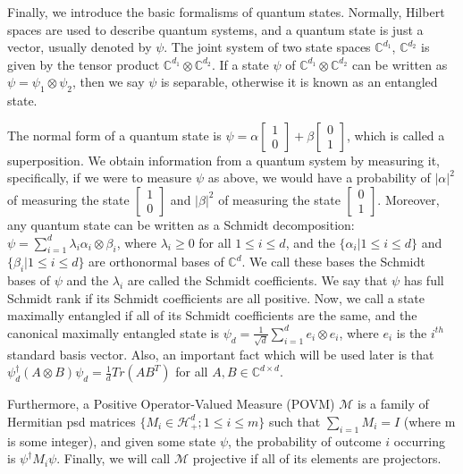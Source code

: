 \documentclass[12pt]{article}
\begin{document}
Finally, we introduce the basic formalisms of quantum
states. Normally, Hilbert spaces are used to describe quantum systems,
and a quantum state is just a vector, usually denoted by $\psi$. The
joint system of two state spaces $\mathbb{C}^{d_1}$,
$\mathbb{C}^{d_2}$ is given by the tensor product $\mathbb{C}^{d_1}
\otimes \mathbb{C}^{d_2}$. If a state $\psi$ of $\mathbb{C}^{d_1}
\otimes \mathbb{C}^{d_2}$ can be written as $\psi = \psi_1 \otimes
\psi_2$, then we say $\psi$ is separable, otherwise it is known as an
entangled state.

The normal form of a quantum state is $\psi = \alpha \begin{bmatrix}
1 \\
0 
\end{bmatrix}
+ \beta
\begin{bmatrix}
0 \\
1
\end{bmatrix}
$, which is called a superposition. We obtain information from a
quantum system by measuring it, specifically, if we were to measure
$\psi$ as above, we would have a probability of $|\alpha|^2$ of
measuring the state $\begin{bmatrix} 1 \\ 0
\end{bmatrix}$ and $|\beta|^2$ of measuring the state $\begin{bmatrix}
0 \\
1 
\end{bmatrix}$. Moreover, any quantum state can be written as a
Schmidt decomposition: $\psi = \sum_{i=1}^d \lambda_i \alpha_i \otimes
\beta_i$, where $\lambda_i \geq 0$ for all $1 \leq i \leq d$, and the
$\{\alpha_i| 1 \leq i \leq d\}$ and $\{\beta_i| 1 \leq i \leq d\}$ are
orthonormal bases of $\mathbb{C}^d$. We call these bases the Schmidt
bases of $\psi$ and the $\lambda_i$ are called the Schmidt
coefficients. We say that $\psi$ has full Schmidt rank if its Schmidt
coefficients are all positive. Now, we call a state maximally
entangled if all of its Schmidt coefficients are the same, and the
canonical maximally entangled state is $\psi_d = \frac{1}{\sqrt{d}}
\sum_{i=1}^d e_i \otimes e_i$, where $e_i$ is the $i^{th}$ standard
basis vector. Also, an important fact which will be used later is that
$\psi^{\dag}_d (A \otimes B) \psi_d = \frac{1}{d} Tr(AB^T)$ for all
$A, B \in \mathbb{C}^{d \times d}$.

Furthermore, a Positive Operator-Valued Measure (POVM) $\mathcal{M}$
is a family of Hermitian psd matrices $\{ M_i \in \mathcal{H}^d_+; 1
\leq i \leq m \}$ such that $\sum_{i=1}M_i = I$ (where m is some
integer), and given some state $\psi$, the probability of outcome $i$
occurring is $\psi^\dag M_i \psi$. Finally, we will call $\mathcal{M}$
projective if all of its elements are projectors.
\end{document}
